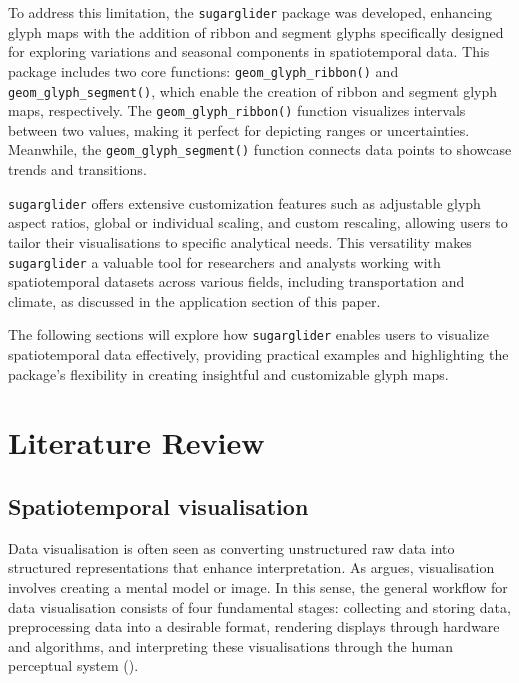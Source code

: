 To address this limitation, the \texttt{sugarglider} package was developed, enhancing glyph maps with the addition of ribbon and segment glyphs specifically designed for exploring variations and seasonal components in spatiotemporal data. This package includes two core functions: \texttt{geom\_glyph\_ribbon()} and \texttt{geom\_glyph\_segment()}, which enable the creation of ribbon and segment glyph maps, respectively. The \texttt{geom\_glyph\_ribbon()} function visualizes intervals between two values, making it perfect for depicting ranges or uncertainties. Meanwhile, the \texttt{geom\_glyph\_segment()} function connects data points to showcase trends and transitions.

\texttt{sugarglider} offers extensive customization features such as adjustable glyph aspect ratios, global or individual scaling, and custom rescaling, allowing users to tailor their visualisations to specific analytical needs. This versatility makes \texttt{sugarglider} a valuable tool for researchers and analysts working with spatiotemporal datasets across various fields, including transportation and climate, as discussed in the application section of this paper.

The following sections will explore how \texttt{sugarglider} enables users to visualize spatiotemporal data effectively, providing practical examples and highlighting the package's flexibility in creating insightful and customizable glyph maps.

\section{Literature Review}\label{literature-review}

\subsection{Spatiotemporal visualisation}\label{spatiotemporal-visualisation}

Data visualisation is often seen as converting unstructured raw data into structured representations that enhance interpretation. As \citet{spence2001information} argues, visualisation involves creating a mental model or image. In this sense, the general workflow for data visualisation consists of four fundamental stages: collecting and storing data, preprocessing data into a desirable format, rendering displays through hardware and algorithms, and interpreting these visualisations through the human perceptual system (\citet{waddell2004introduction}).

